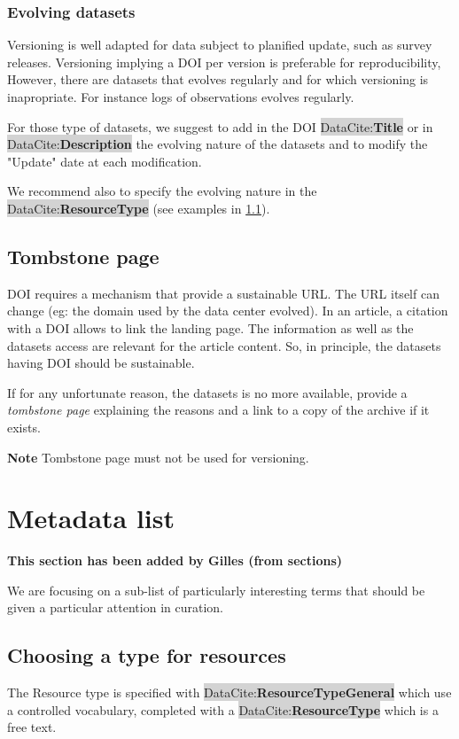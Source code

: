 \documentclass[11pt,a4paper]{ivoa}
\newcommand{\dataciteterm}[1]{\colorbox{lightgray}{DataCite:\textbf{#1}}}
\newcommand{\important}[1]{
	\begin{bigdescription}
		\item \color{ivoacolor}\textbf{Note} #1
	\end{bigdescription}
}
\begin{document}
\subsubsection{Evolving datasets}
\label{sec:evolving}
Versioning is well adapted for data subject to planified update, such as survey releases. Versioning implying a DOI per version is preferable for reproducibility, 
However, there are datasets that evolves regularly and for which versioning is inapropriate. For instance logs of observations evolves regularly.


For those type of datasets, we suggest to add in the DOI \dataciteterm{Title} or in \dataciteterm{Description} the evolving nature of the datasets and to modify the "Update" date at each modification.

We recommend also to specify the evolving nature in the \dataciteterm{ResourceType} (see examples in \ref{sec:resourcetype}).\\


\subsection{Tombstone page}
\label{sec:tombstone}
DOI requires a mechanism that provide a sustainable URL. The URL itself can change (eg: the domain used by the data center evolved).
In an article, a citation with a DOI allows to link the landing page. The information as well as the datasets access are relevant for the article content. So, in principle, the datasets having DOI should be sustainable. 


If for any unfortunate reason, the datasets is no more available, provide a \textit{tombstone page} explaining the reasons and a link to a copy of the archive if it exists.

\important{Tombstone page must not be used for versioning.}


\section{Metadata list}
\textbf{\color{red}This section has been added by Gilles (from sections)}

We are focusing on a sub-list of particularly interesting terms that should be given a particular attention in curation.


\subsection{Choosing a type for resources}\label{sec:resourcetype}
The Resource type is specified with  \dataciteterm{ResourceTypeGeneral} which use a controlled vocabulary, completed with a \dataciteterm{ResourceType} which is a free text.
\end{document}
